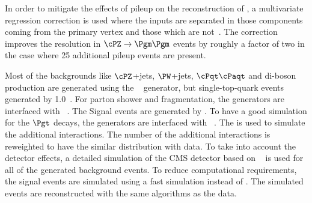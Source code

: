 In order to mitigate the effects of pileup on the reconstruction of \MET, a multivariate regression correction is used where the inputs are separated in those components coming from the primary vertex and those which are not~\cite{CMS-JME-12-002}.
The correction improves the \MET resolution in $\cPZ\to\Pgm\Pgm$ events by roughly a factor of two in the case where 25 additional pileup events are present.

Most of the backgrounds like $\cPZ$+jets, $\PW$+jets, $\cPqt\cPaqt$ and di-boson production are generated using the ~\cite{Alwall:2011uj} generator, but single-top-quark events generated by {\POWHEG} 1.0~\cite{Nason:2004rx,Frixione:2007vw,Alioli:2009je,Alioli:2010xd}.
For parton shower  and fragmentation, the generators are interfaced with ~\cite{Sjostrand:2006za}.
The Signal events are generated by  \PYTHIA. To have a good simulation for the $\Pgt$ decays, the generators are interfaced with  \TAUOLA~\cite{Davidson:2010rw}. The \PYTHIA is used to simulate the additional interactions. The number of the additional interactions is reweighted to have the similar distribution with data. To take into account the detector effects, a detailed simulation of the CMS detector based on {\GEANTfour}~\cite{Agostinelli:2002hh} is used for all of the generated background events. To reduce  computational requirements, the signal events are simulated using a fast simulation \cite{Abdullin:2011zz} instead of {\GEANTfour}. 
The simulated events are reconstructed with the same algorithms as the data.






